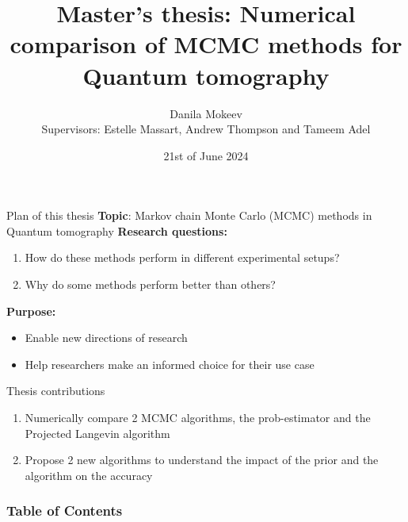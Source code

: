 \documentclass{beamer}
\title{Master's thesis: Numerical comparison of MCMC methods for Quantum tomography}
\author[Mokeev]
{ Danila Mokeev\\{\small Supervisors: Estelle Massart, Andrew Thompson and Tameem Adel}}
\institute[EPL]{Ecole Polytechnique de Louvain}
\date{21st of June 2024}
\newcommand{\tb}{\textbf}
\begin{document}
\frame{\titlepage}

\begin{frame}{Plan of this thesis}
    \tb{Topic}: Markov chain Monte Carlo (MCMC) methods in Quantum tomography\medbreak
    \tb{Research questions:} 
    \begin{enumerate}
        \item How do these methods perform in different experimental setups?
        \item Why do some methods perform better than others?
    \end{enumerate}
    \tb{Purpose:}
    \begin{itemize}
        \item Enable new directions of research
        \item Help researchers make an informed choice for their use case 
    \end{itemize}
\end{frame}
\begin{frame}{Thesis contributions}
    \begin{enumerate}
        \item Numerically compare 2 MCMC algorithms, the prob-estimator and the Projected Langevin algorithm
        \item Propose 2 new algorithms to understand the impact of the prior and the algorithm on the accuracy
    \end{enumerate}
\end{frame}

\begin{frame}
\frametitle{Table of Contents}
\tableofcontents
\end{frame}
\end{document}
